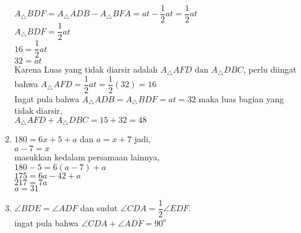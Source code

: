 \documentclass[10pt,a4paper]{article}
\begin{document}
\begin{enumerate}
	$A_\triangle BDF=A_\triangle ADB - A_\triangle BFA=at-\dfrac{1}{2}at=\dfrac{1}{2}at$\\
	$A_\triangle BDF=\dfrac{1}{2}at$\\
	$16=\dfrac{1}{2}at$\\
	$32=at$\\
	Karena Luas yang tidak diarsir adalah $A_\triangle AFD \text{ dan } A_\triangle DBC$, perlu diingat bahwa $A_\triangle AFD=\dfrac{1}{2}at=\dfrac{1}{2}(32)=16$\\
	Ingat pula bahwa $A_\triangle ADB=A_\triangle BDF=at=32$
	maka luas bagian yang tidak diarsir,\\
	$A_\triangle AFD + A_\triangle DBC=15+32=48$
	\item $180=6x+5+a$ dan $a=x+7$ jadi,\\
		  $a-7=x$\\
		  masukkan kedalam persamaan lainnya,\\
		  $180-5=6(a-7)+a$\\
		  $175=6a-42+a$\\
		  $217=7a$\\
		  $a=31$
	\item $\angle BDE = \angle ADF$ dan sudut $\angle CDA= \dfrac{1}{2}\angle EDF$.\medskip \\
		  ingat pula bahwa $\angle CDA + \angle ADF = 90^o$\\
		  

\end{enumerate}
\end{document}

